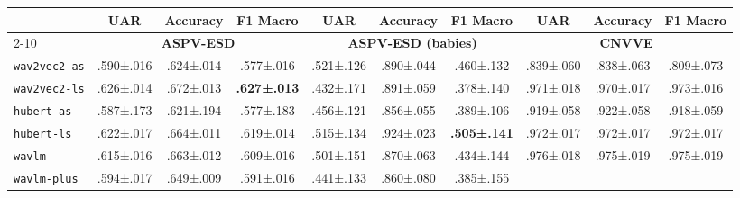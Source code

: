 \begin{table*}[]
\caption{10-Fold CV fine-tuning results across the explored six datasets.}
\vspace{-1mm}
\label{table:results}
\centering
\begin{tabular}{l|ccc|ccc|ccc}
\toprule
& \textbf{UAR}
    & \textbf{Accuracy} 
    & \textbf{F1 Macro} 
    & \textbf{UAR} 
    & \textbf{Accuracy} 
    & \textbf{F1 Macro} 
    & \textbf{UAR} 
    & \textbf{Accuracy} 
    & \textbf{F1 Macro} \\
\cmidrule{2-10}
\multirow{-2}{*}{\textbf{Model}} 
    & \multicolumn{3}{c}{\textbf{ASPV-ESD}} 
    & \multicolumn{3}{c}{\textbf{ASPV-ESD (babies)}} 
    & \multicolumn{3}{c}{\textbf{CNVVE}} \\
\midrule
\texttt{wav2vec2-as}
    & .590\scriptsize±.016 
    & .624\scriptsize±.014 
    & .577\scriptsize±.016 
    & .521\scriptsize±.126 
    & .890\scriptsize±.044 
    & .460\scriptsize±.132 
    & .839\scriptsize±.060 
    & .838\scriptsize±.063 
    & .809\scriptsize±.073 \\
\texttt{wav2vec2-ls}
    & .626\scriptsize±.014 
    & .672\scriptsize±.013 
    & \cellcolor[HTML]{D9EAD3}\textbf{.627\scriptsize±.013} 
    & .432\scriptsize±.171 
    & .891\scriptsize±.059 
    & .378\scriptsize±.140 
    & .971\scriptsize±.018 
    & .970\scriptsize±.017
    & .973\scriptsize±.016 \\
\texttt{hubert-as}
    & .587\scriptsize±.173 
    & .621\scriptsize±.194 
    & .577\scriptsize±.183 
    & .456\scriptsize±.121 
    & .856\scriptsize±.055 
    & .389\scriptsize±.106 
    & .919\scriptsize±.058 
    & .922\scriptsize±.058 
    & .918\scriptsize±.059 \\
\texttt{hubert-ls}
    & .622\scriptsize±.017 
    & .664\scriptsize±.011 
    & .619\scriptsize±.014 
    & .515\scriptsize±.134 
    & .924\scriptsize±.023 
    & \cellcolor[HTML]{D9EAD3}\textbf{.505\scriptsize±.141} 
    & .972\scriptsize±.017 
    & .972\scriptsize±.017 
    & .972\scriptsize±.017 \\
\texttt{wavlm}
    & .615\scriptsize±.016 
    & .663\scriptsize±.012 
    & .609\scriptsize±.016 
    & .501\scriptsize±.151 
    & .870\scriptsize±.063
    & .434\scriptsize±.144 
    & .976\scriptsize±.018 
    & .975\scriptsize±.019 
    & .975\scriptsize±.019 \\
\texttt{wavlm-plus} 
    & .594\scriptsize±.017 
    & .649\scriptsize±.009 
    & .591\scriptsize±.016 
    & .441\scriptsize±.133 
    & .860\scriptsize±.080 
    & .385\scriptsize±.155 

\end{tabular}
\end{table*}
